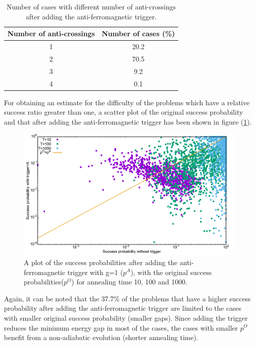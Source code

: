 \documentclass[../main.tex]{subfiles}
\begin{document}
\begin{table}[H]
\centering
\renewcommand{\arraystretch}{1.5}
\begin{tabular}{|c|c|}
\hline 
Number of anti-crossings & Number of cases (\%) \\ 
\hline 
1 & 20.2 \\ 
\hline 
2 & 70.5 \\ 
\hline 
3 & 9.2 \\ 
\hline 
4 & 0.1 \\ 
\hline 
\end{tabular} 
\caption{Number of cases with different number of anti-crossings after adding the anti-ferromagnetic trigger.}
\label{tab:a4}

\end{table}
For obtaining an estimate for the difficulty of the problems which have a relative success ratio greater than one, a scatter plot of the original success probability and that after adding the anti-ferromagnetic trigger has been shown in figure (\ref{fig:a22}).


\begin{figure}[H]
\centering 
\includegraphics[scale=0.3]{ProbScat_g1.png}
\caption{A plot of the success probabilities after adding the anti-ferromagnetic trigger with g=1 ($p^A$), with the original success probabilities($p^O$) for annealing time 10, 100 and 1000.}
\label{fig:a22}
\end{figure}

Again, it can be noted that the 37.7\% of the problems that have a higher success probability after adding the anti-ferromagnetic trigger are limited to the cases with smaller original success probability (smaller gaps). Since adding the trigger reduces the minimum energy gap in most of the cases, the cases with smaller $p^O$ benefit from a non-adiabatic evolution (shorter annealing time).\\
\end{document}
